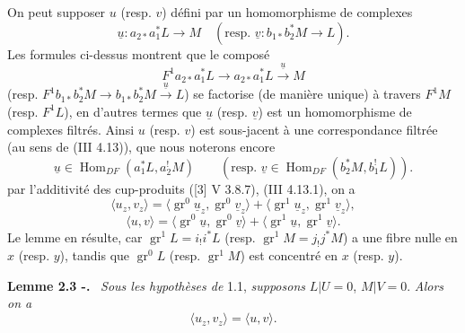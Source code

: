\documentclass[11pt]{article}
\newenvironment{statement}[1]{\par\medskip\noindent\textbf{#1.}\ }{\par\medskip}
\DeclareMathOperator{\Hom}{Hom}
\providecommand{\Hom}{\operatorname{Hom}}
\providecommand{\Hom}{\operatorname{Hom}}
\begin{document}
On peut supposer $u$ (resp. $v$) défini par un homomorphisme de complexes
\[
\underline{u}:a_{2*}a_1^*L\longrightarrow M
\quad
(\text{resp. }\underline{v}:b_{1*}b_2^*M\longrightarrow L).
\]
Les formules ci-dessus montrent que le composé
\[
F^1a_{2*}a_1^*L\longrightarrow a_{2*}a_1^*L\xrightarrow{\underline{u}}M
\]
(resp. $F^1b_{1*}b_2^*M\to b_{1*}b_2^*M\xrightarrow{\underline{u}}L$) se factorise (de manière unique) à travers $F^1M$ (resp. $F^1L$), en d'autres termes que $\underline{u}$ (resp. $\underline{v}$) est un homomorphisme de complexes filtrés. Ainsi $u$ (resp. $v$) est sous-jacent à une correspondance filtrée (au sens de (III 4.13)), que nous noterons encore
\[
\underline{u}\in\Hom_{DF}(a_1^*L,a_2^!M)\qquad
(\text{resp. }\underline{v}\in\Hom_{DF}(b_2^*M,b_1^!L)).
\]
par l'additivité des cup-produits ([3] V 3.8.7), (III 4.13.1), on a
\[
\langle u_z,v_z\rangle
 =\langle \operatorname{gr}^0\underline{u}_z,\operatorname{gr}^0\underline{v}_z\rangle
 +\langle \operatorname{gr}^1\underline{u}_z,\operatorname{gr}^1\underline{v}_z\rangle,
\]
\[
\langle u,v\rangle
 =\langle \operatorname{gr}^0\underline{u},\operatorname{gr}^0\underline{v}\rangle
 +\langle \operatorname{gr}^1\underline{u},\operatorname{gr}^1\underline{v}\rangle.
\]
Le lemme en résulte, car $\operatorname{gr}^1L=i_!i^*L$ (resp. $\operatorname{gr}^1M=j_!j^*M$) a une fibre nulle en $x$ (resp. $y$), tandis que $\operatorname{gr}^0L$ (resp. $\operatorname{gr}^1M$) est concentré en $x$ (resp. $y$).

\begin{statement}{Lemme 2.3 -}
\emph{Sous les hypothèses de} 1.1, \emph{supposons} $L|U=0$, $M|V=0$. \emph{Alors on a}
\[
\langle u_z,v_z\rangle=\langle u,v\rangle .
\]
\end{statement}
\end{document}
